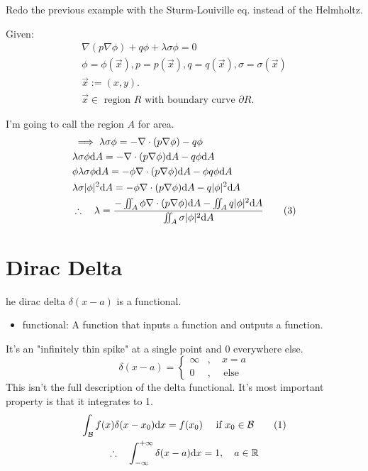 \begin{example}
  Redo the previous example with the Sturm-Louiville eq. instead of the Helmholtz. 

  Given: 
  \begin{gather*}
    \nabla (p\nabla\phi) + q\phi + \lambda\sigma \phi = 0\\
    \phi = \phi(\vec{x}), p = p(\vec{x}), q = q(\vec{x}), 
      \sigma = \sigma(\vec{x}) \\
    \vec{x} := (x, y).  \\
    \vec{x} \in \text{ region $R$ with boundary curve $\partial R$}.  
  \end{gather*}

I'm going to call the region $A$ for area. 
\begin{align*}
&\implies \lambda \sigma \phi 
  = - \nabla\cdot(p\nabla \phi) - q\phi  \\  
& \lambda \sigma \phi \text{d} A 
  = - \nabla\cdot(p\nabla \phi)\text{d} A - q\phi \text{d} A  \\
& \phi \lambda \sigma \phi \text{d} A 
  = - \phi \nabla\cdot(p\nabla \phi)\text{d} A - \phi q\phi \text{d} A  \\
& \lambda \sigma |\phi|^2 \text{d} A 
  = - \phi \nabla\cdot(p\nabla \phi)\text{d} A - q|\phi|^2 \text{d} A  \\
& \therefore \quad \lambda 
  = \frac{ - \iint_A \phi \nabla\cdot(p\nabla \phi)\text{d} A 
    - \iint_A q|\phi|^2 \text{d} A  }
    { \iint_A \sigma |\phi|^2 \text{d} A} \tag{3} 
\end{align*}
\end{example}

\section{Dirac Delta}

he dirac delta $\delta(x - a)$ is a functional.
\begin{itemize}
  \item functional: A function that inputs a function and outputs a function. 
\end{itemize}

It's an "infinitely thin spike" at a single point and 0 everywhere else. 
\[ \delta(x - a) = \begin{cases}
  \infty  &,\quad  x = a  \\
  0 &, \quad \text{ else } 
\end{cases}\] This isn't the full description of the delta functional. It's most important property is that it integrates to 1. 
\begin{gather*}
  \int_{\mathcal{B}} f(x) \delta(x - x_0) \text{d} x = f(x_0)
    \quad\text{ if }x_0\in\mathcal{B}  \tag{1} \\
  \therefore \quad 
    \int_{-\infty}^{+\infty} \delta (x - a) \text{d} x = 1, 
    \quad a\in\mathbb{R} \\
\end{gather*}

